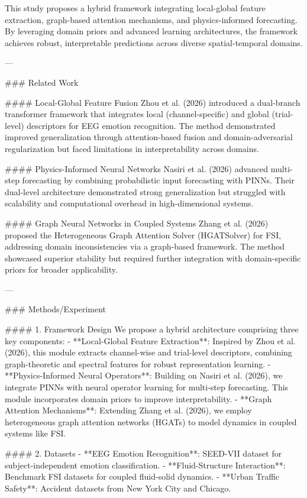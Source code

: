 This study proposes a hybrid framework integrating local-global feature extraction, graph-based attention mechanisms, and physics-informed forecasting. By leveraging domain priors and advanced learning architectures, the framework achieves robust, interpretable predictions across diverse spatial-temporal domains.

---

### Related Work

#### Local-Global Feature Fusion
Zhou et al. (2026) introduced a dual-branch transformer framework that integrates local (channel-specific) and global (trial-level) descriptors for EEG emotion recognition. The method demonstrated improved generalization through attention-based fusion and domain-adversarial regularization but faced limitations in interpretability across domains.

#### Physics-Informed Neural Networks
Nasiri et al. (2026) advanced multi-step forecasting by combining probabilistic input forecasting with PINNs. Their dual-level architecture demonstrated strong generalization but struggled with scalability and computational overhead in high-dimensional systems.

#### Graph Neural Networks in Coupled Systems
Zhang et al. (2026) proposed the Heterogeneous Graph Attention Solver (HGATSolver) for FSI, addressing domain inconsistencies via a graph-based framework. The method showcased superior stability but required further integration with domain-specific priors for broader applicability.

---

### Methods/Experiment

#### 1. Framework Design
We propose a hybrid architecture comprising three key components:
- **Local-Global Feature Extraction**: Inspired by Zhou et al. (2026), this module extracts channel-wise and trial-level descriptors, combining graph-theoretic and spectral features for robust representation learning.
- **Physics-Informed Neural Operators**: Building on Nasiri et al. (2026), we integrate PINNs with neural operator learning for multi-step forecasting. This module incorporates domain priors to improve interpretability.
- **Graph Attention Mechanisms**: Extending Zhang et al. (2026), we employ heterogeneous graph attention networks (HGATs) to model dynamics in coupled systems like FSI.

#### 2. Datasets
- **EEG Emotion Recognition**: SEED-VII dataset for subject-independent emotion classification.
- **Fluid-Structure Interaction**: Benchmark FSI datasets for coupled fluid-solid dynamics.
- **Urban Traffic Safety**: Accident datasets from New York City and Chicago.

